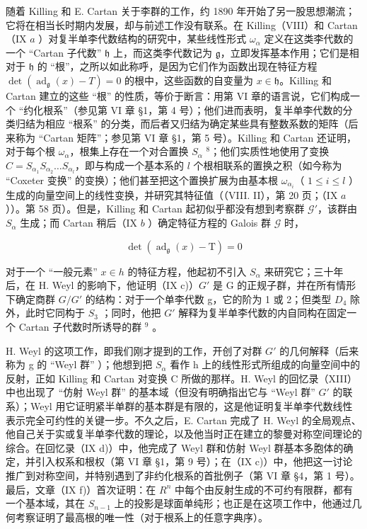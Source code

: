随着 Killing 和 E. Cartan 关于李群的工作，约 1890 年开始了另一股思想潮流；它将在相当长时期内发展，却与前述工作没有联系。在 Killing（VIII）和 Cartan（IX \(a\) ）对复半单李代数结构的研究中，某些线性形式 \(\omega_{\alpha}\) 定义在这类李代数的一个 ``Cartan 子代数'' \(\mathfrak{h}\) 上，而这类李代数记为 \(\mathfrak{g}\)，立即发挥基本作用；它们是相对于 \(\mathfrak{h}\) 的 ``根''，之所以如此称呼，是因为它们作为函数出现在特征方程 \(\det(\operatorname{ad}_{\mathfrak{g}}(x)-T)=0\) 的根中，这些函数的自变量为 \(x\in\mathfrak{h}\)。Killing 和 Cartan 建立的这些 ``根'' 的性质，等价于断言：用第 VI 章的语言说，它们构成一个 ``约化根系''（参见第 VI 章 §1，第 4 号）；他们进而表明，复半单李代数的分类归结为相应 ``根系'' 的分类，而后者又归结为确定某些具有整数系数的矩阵（后来称为 ``Cartan 矩阵''；参见第 VI 章 §1，第 5 号）。Killing 和 Cartan 还证明，对于每个根 \(\omega_{\alpha}\)，根集上存在一个对合置换 \(S_{\alpha}\) \(^{8}\)；他们实质性地使用了变换 \(C = S_{\alpha_1}S_{\alpha_2} \ldots S_{\alpha_l}\)，即与构成一个基本系的 \(l\) 个根相联系的置换之积（如今称为 ``Coxeter 变换'' 的变换）；他们甚至把这个置换扩展为由基本根 \(\omega_{\alpha_i}\)（ \(1 \leqslant i \leqslant l\) ）生成的向量空间上的线性变换，并研究其特征值（（VIII. II），第 20 页；（IX \(a\) ））。第 58 页）。但是，Killing 和 Cartan 起初似乎都没有想到考察群 \(\mathcal{G}'\)，该群由 \(S_{\alpha}\) 生成；而 Cartan 稍后（IX \(b\) ）确定特征方程的 Galois 群 \(\mathcal{G}\) 时，

\[
\det (\operatorname{ad} _ {\mathfrak {g}} (x) - \mathrm{T}) = 0
\]

对于一个 ``一般元素'' \(x \in h\) 的特征方程，他起初不引入 \(S_{\alpha}\) 来研究它；三十年后，在 H. Weyl 的影响下，他证明（IX c)）\(G'\) 是 G 的正规子群，并在所有情形下确定商群 \(G/G'\) 的结构：对于一个单李代数 g，它的阶为 1 或 2；但类型 \(D_{4}\) 除外，此时它同构于 \(S_{3}\) ；同时，他把 \(G'\) 解释为复半单李代数的内自同构在固定一个 Cartan 子代数时所诱导的群 \(^{9}\) 。

H. Weyl 的这项工作，即我们刚才提到的工作，开创了对群 \(G'\) 的几何解释（后来称为 g 的 ``Weyl 群'' ）；他想到把 \(S_{\alpha}\) 看作 h 上的线性形式所组成的向量空间中的反射，正如 Killing 和 Cartan 对变换 C 所做的那样。H. Weyl 的回忆录（XIII）中也出现了 ``仿射 Weyl 群'' 的基本域（但没有明确指出它与 ``Weyl 群'' \(G'\) 的联系）；Weyl 用它证明紧半单群的基本群是有限的，这是他证明复半单李代数线性表示完全可约性的关键一步。不久之后，E. Cartan 完成了 H. Weyl 的全局观点、他自己关于实或复半单李代数的理论，以及他当时正在建立的黎曼对称空间理论的综合。在回忆录（IX d)）中，他完成了 Weyl 群和仿射 Weyl 群基本多胞体的确定，并引入权系和根权（第 VI 章 §1，第 9 号）；在（IX c)）中，他把这一讨论推广到对称空间，并特别遇到了非约化根系的首批例子（第 VI 章 §4，第 1 号）。最后，文章（IX f)）首次证明：在 \(R^{n}\) 中每个由反射生成的不可约有限群，都有一个基本域，其在 \(S_{n-1}\) 上的投影是球面单纯形；也正是在这项工作中，他通过几何考察证明了最高根的唯一性（对于根系上的任意字典序）。

